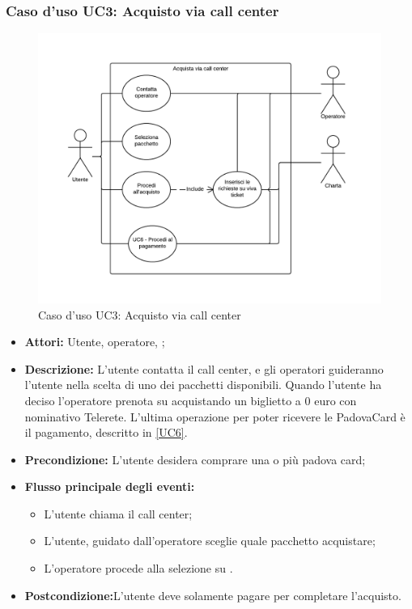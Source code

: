 \subsubsection{Caso d'uso UC3: Acquisto via call center}\label{UC3}
\begin{figure}[H]
\centering
\includegraphics[width=1\textwidth]{images/UC3.png}
\caption{Caso d'uso UC3: Acquisto via call center}
\end{figure}
\begin{itemize}
\item \textbf{Attori:} Utente, operatore, \charta;
\item \textbf{Descrizione:} L'utente contatta il call center, e gli operatori guideranno l'utente nella scelta di uno dei pacchetti disponibili. Quando l'utente ha deciso l'operatore prenota su \tlite acquistando un biglietto a 0 euro con nominativo Telerete. L'ultima operazione per poter ricevere le PadovaCard è il pagamento, descritto in \ref{UC6}.
\item \textbf{Precondizione:} L'utente desidera comprare una o più padova card;
\item \textbf{Flusso principale degli eventi:}
	\begin{itemize}
		\item L'utente chiama il call center;
		\item L'utente, guidato dall'operatore sceglie quale pacchetto acquistare;
        \item L'operatore procede alla selezione su \tlite.
	\end{itemize}
\item \textbf{Postcondizione:}L'utente deve solamente pagare per completare l'acquisto.
\end{itemize}

